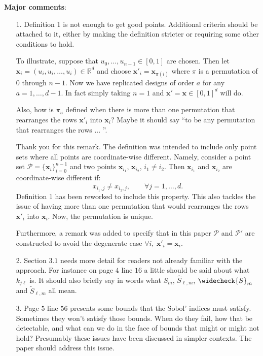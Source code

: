 \documentclass[10pt,a4paper]{article}
\newcommand{\vect}[1]{\boldsymbol{\mathbf{#1}}}
\newcommand{\vx}{\vect{x}}
\newcommand{\hS}{\widehat{S}}
\newcommand{\tS}{\widetilde{S}}
\newcommand{\wcS}{\widecheck{S}}
\begin{document}
\textbf{Major comments}:
\begin{itemize}
\item[1.] Definition 1 is not enough to get good points. Additional criteria should be attached to it, either by making the definition stricter or requiring some
other conditions to hold.

To illustrate, suppose that $u_0,\dots,u_{n-1} \in [0,1]$ are chosen. Then let $\vx_i = (u_i, u_i, \dots,u_i) \in \mathbb{R}^d$ and choose $\vx'_i= \vx_{\pi(i)}$ where $\pi$ is a permutation
of $0$ through $n-1$. Now we have replicated designs of order $a$ for any $a = 1,\dots,d-1$. In fact simply taking $n = 1$ and $\vx'=\vx \in [0,1]^d$ will do.

Also, how is $\pi_u$ defined when there is more than one permutation that rearranges the rows $\vx'_i$ into $\vx_i$? Maybe it should say ``to be any permutation
that rearranges the rows ... ''.

{\color{blue} Thank you for this remark. The definition was intended to include only point sets where all points are coordinate-wise different. Namely, consider a point set $\mathcal{P}=\{\vx_i\}_{i=0}^{n-1}$ and two points $\vx_{i_1}$, $\vx_{i_2}$, $i_1 \neq i_2$. Then $\vx_{i_1}$ and $\vx_{i_2}$ are coordinate-wise different if: 
$$ x_{i_1,j} \neq x_{i_2,j}, \qquad \forall j=1,\dots,d .$$
Definition 1 has been reworked to include this property. This also tackles the issue of having more than one permutation that would rearranges the rows $\vx'_i$ into $\vx_i$. Now, the permutation is unique.

Furthermore, a remark was added to specify that in this paper $\mathcal{P}$ and $\mathcal{P}'$ are constructed to avoid the degenerate case $\forall i, \ \vx'_i=\vx_i$.}



\item[2.] Section $3.1$ needs more detail for readers not already familiar with the approach. For instance on page $4$ line $16$ a little should be said about what $k_{j\ell}$ is. It should also briefly say in words what $S_m$, $\hS_{\ell,m}$, $\wcS_m$ and $\tS_{\ell,m}$ all mean.

\item[3.] Page $5$ line $56$ presents some bounds that the Sobol' indices must satisfy. Sometimes they won't satisfy those bounds. When do they fail, how that
be detectable, and what can we do in the face of bounds that might or might not hold? Presumably these issues have been discussed in simpler contexts. The paper should address this issue.


\end{itemize}
\end{document}
